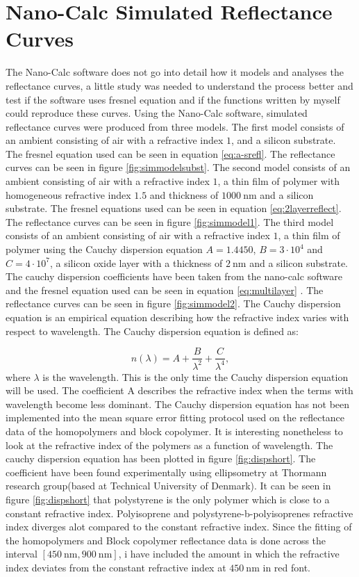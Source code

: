 \documentclass[MasterThesisMain.tex]{subfiles}
\begin{document}
\section{Nano-Calc Simulated Reflectance Curves}
The Nano-Calc software does not go into detail how it models and analyses the reflectance curves, a little study was needed to understand the process better and test if the software uses fresnel equation and if the functions written by myself could reproduce these curves. Using the Nano-Calc software, simulated reflectance curves were produced from three models. The first model consists of an ambient consisting of air with a refractive index $1$, and a silicon substrate. The fresnel equation used can be seen in equation \ref{eq:a-srefl}. The reflectance curves can be seen in figure \ref{fig:simmodelsubst}. The second model consists of an ambient consisting of air with a refractive index $1$, a thin film of polymer with homogeneous refractive index $1.5$ and thickness of $\SI{1000}{\nano\meter}$ and a silicon substrate. The fresnel equations used can be seen in equation \ref{eq:2layerreflect}. The reflectance curves can be seen in figure \ref{fig:simmodel1}. The third model consists of an ambient consisting of air with a refractive index $1$, a thin film of polymer using the Cauchy dispersion equation $A=1.4450$, $B=3 \cdot 10^4$ and $C=4 \cdot 10^7$, a silicon oxide layer with a thickness of $\SI{2}{\nano\meter}$ and a silicon substrate. The cauchy dispersion coefficients have been taken from the nano-calc software and the fresnel equation used can be seen in equation \ref{eq:multilayer} . The reflectance curves can be seen in figure \ref{fig:simmodel2}. The Cauchy dispersion equation is an empirical equation describing how the refractive index varies with respect to wavelength. The Cauchy dispersion equation is defined as:

\begin{equation}
n(\lambda) = A + \frac{B}{\lambda^2} + \frac{C}{\lambda^4},
\end{equation}
where $\lambda$ is the wavelength. This is the only time the Cauchy dispersion equation will be used. The coefficient A describes the refractive index when the terms with wavelength become less dominant. The Cauchy dispersion equation has not been implemented into the mean square error fitting protocol used on the reflectance data of the homopolymers and block copolymer. It is interesting nonetheless to look at the refractive index of the polymers as a function of wavelength. The cauchy dispersion equation has been plotted in figure \ref{fig:dispshort}. The coefficient have been found experimentally using ellipsometry at Thormann research group(based at Technical University of Denmark). It can be seen in figure \ref{fig:dispshort} that polystyrene is the only polymer which is close to a constant refractive index. Polyisoprene and polystyrene-b-polyisoprenes refractive index diverges alot compared to the constant refractive index. Since the fitting of the homopolymers and Block copolymer reflectance data is done across the interval $[\SI{450}{\nano\meter},\SI{900}{\nano\meter}]$, i have included the amount in which the refractive index deviates from the constant refractive index at $\SI{450}{\nano\meter}$ in red font.   
\end{document}
